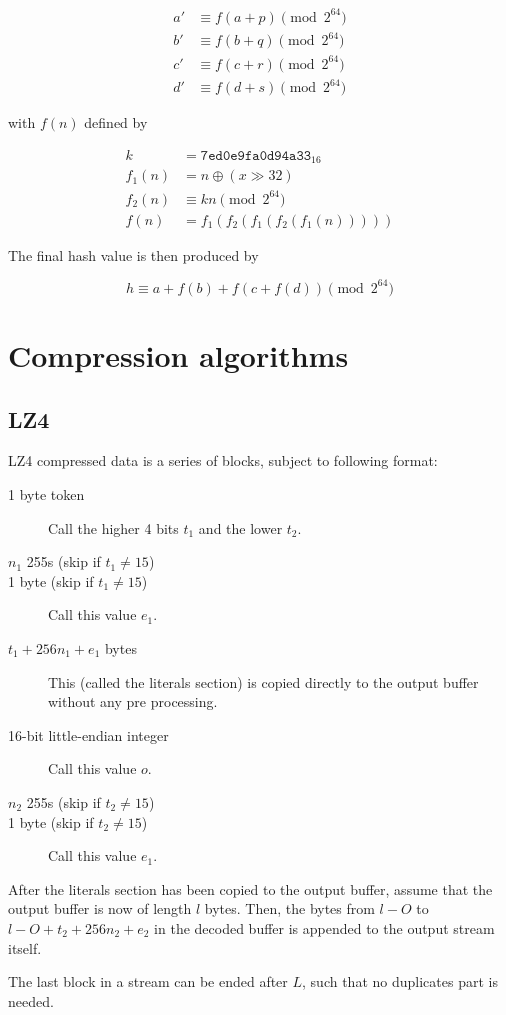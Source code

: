 \documentclass[11pt,a4paper]{report}
\begin{document}
        \begin{align*}
            a' &\equiv f(a + p) \pmod{2^{64}} \\
            b' &\equiv f(b + q) \pmod{2^{64}} \\
            c' &\equiv f(c + r) \pmod{2^{64}} \\
            d' &\equiv f(d + s) \pmod{2^{64}}
        \end{align*}

        with $f(n)$ defined by

        \begin{align*}
            k      &=      \texttt{7ed0e9fa0d94a33}_{16} \\
            f_1(n) &=      n \oplus (x \gg 32) \\
            f_2(n) &\equiv kn \pmod{2^{64}} \\
            f(n)   &=      f_1(f_2(f_1(f_2(f_1(n)))))
        \end{align*}

        The final hash value is then produced by

        $$h \equiv a + f(b) + f(c + f(d)) \pmod{2^{64}}$$

    \section{Compression algorithms}
        \subsection{LZ4}
        \label{compression:lz4}
        LZ4 compressed data is a series of blocks, subject to following format:

        \begin{description}
            \item [1 byte token] Call the higher 4 bits $t_1$ and the lower $t_2$.
            \item [$n_1$ 255s (skip if $t_1 \neq 15$)]
            \item [1 byte (skip if $t_1 \neq 15$)] Call this value $e_1$.
            \item [$t_1 + 256n_1 + e_1$ bytes] This (called the literals
                section) is copied directly to the output buffer without any
                pre processing.
            \item [16-bit little-endian integer] Call this value $o$.
            \item [$n_2$ 255s (skip if $t_2 \neq 15$)]
            \item [1 byte (skip if $t_2 \neq 15$)] Call this value $e_1$.
        \end{description}

        After the literals section has been copied to the output buffer, assume
        that the output buffer is now of length $l$ bytes. Then, the bytes from
        $l - O$ to $l - O + t_2 + 256n_2 + e_2$ in the decoded buffer is
        appended to the output stream itself.

        The last block in a stream can be ended after $L$, such that no
        duplicates part is needed.
\end{document}
